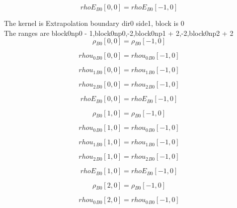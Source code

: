 \documentclass{article}
\begin{document}
\begin{dmath}{rhoE{_{B0}}}[{0,0}] = {rhoE{_{B0}}}[{-1,0}]\end{dmath}

\noindent The kernel is Extrapolation boundary dir0 side1, block is 0\\\noindent The ranges are block0np0 - 1,block0np0,-2,block0np1 + 2,-2,block0np2 + 2\\\begin{dmath}{\rho{_{B0}}}[{0,0}] = {\rho{_{B0}}}[{-1,0}]\end{dmath}

\begin{dmath}{rhou_{0}{_{B0}}}[{0,0}] = {rhou_{0}{_{B0}}}[{-1,0}]\end{dmath}

\begin{dmath}{rhou_{1}{_{B0}}}[{0,0}] = {rhou_{1}{_{B0}}}[{-1,0}]\end{dmath}

\begin{dmath}{rhou_{2}{_{B0}}}[{0,0}] = {rhou_{2}{_{B0}}}[{-1,0}]\end{dmath}

\begin{dmath}{rhoE{_{B0}}}[{0,0}] = {rhoE{_{B0}}}[{-1,0}]\end{dmath}

\begin{dmath}{\rho{_{B0}}}[{1,0}] = {\rho{_{B0}}}[{-1,0}]\end{dmath}

\begin{dmath}{rhou_{0}{_{B0}}}[{1,0}] = {rhou_{0}{_{B0}}}[{-1,0}]\end{dmath}

\begin{dmath}{rhou_{1}{_{B0}}}[{1,0}] = {rhou_{1}{_{B0}}}[{-1,0}]\end{dmath}

\begin{dmath}{rhou_{2}{_{B0}}}[{1,0}] = {rhou_{2}{_{B0}}}[{-1,0}]\end{dmath}

\begin{dmath}{rhoE{_{B0}}}[{1,0}] = {rhoE{_{B0}}}[{-1,0}]\end{dmath}

\begin{dmath}{\rho{_{B0}}}[{2,0}] = {\rho{_{B0}}}[{-1,0}]\end{dmath}

\begin{dmath}{rhou_{0}{_{B0}}}[{2,0}] = {rhou_{0}{_{B0}}}[{-1,0}]\end{dmath}
\end{document}
